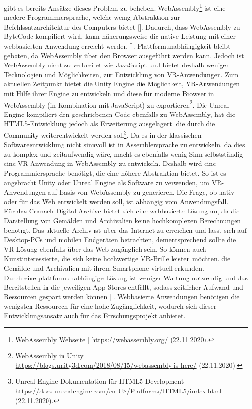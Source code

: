 \documentclass[a4paper,12pt,oneside]{article}
\begin{document}
        gibt es bereits Ansätze dieses Problem zu beheben. WebAssembly\footnote{WebAssembly Webseite | \url{https://webassembly.org/} (22.11.2020).}
        ist eine niedere Programmiersprache, welche wenig Abstraktion zur Befehlssatzarchitektur
        des Computers bietet [\cite[185]{Haas2017Jun}]. Dadurch, dass WebAssembly zu ByteCode
        kompiliert wird, kann näherungsweise die native Leistung mit einer webbasierten Anwendung 
        erreicht werden [\cite[186]{Haas2017Jun}]. 
        Plattformunabhängigkeit bleibt geboten,
        da WebAssembly über den Browser ausgeführt werden kann.
        Jedoch ist WebAssembly nicht
        so verbreitet wie JavaScript und bietet deshalb weniger Technologien und Möglichkeiten,
        zur Entwicklung von VR-Anwendungen. Zum aktuellen Zeitpunkt bietet die Unity Engine
        die Möglichkeit, VR-Anwendungen mit Hilfe ihrer Engine zu entwickeln und
        diese für moderne Browser in WebAssembly (in Kombination mit JavaScript) 
        zu exportieren\footnote{WebAssembly in Unity | \url{https://blogs.unity3d.com/2018/08/15/webassembly-is-here/} (22.11.2020).}.
        Die Unreal Engine kompiliert den geschriebenen Code ebenfalls zu WebAssembly,
        hat die HTML5-Entwicklung jedoch als Erweiterung ausgelagert, die durch
        die Community weiterentwickelt werden soll\footnote{Unreal Engine Dokumentation für HTML5 Development | \url{https://docs.unrealengine.com/en-US/Platforms/HTML5/index.html} (22.11.2020).}.
        Da es in der klassischen Softwareentwicklung nicht sinnvoll ist in Assemblersprache
        zu entwickeln, da dies zu komplex und zeitaufwendig wäre, 
        macht es ebenfalls wenig Sinn selbstständig eine VR-Anwendung in 
        WebAssembly zu entwickeln. Deshalb wird eine Programmiersprache benötigt, die
        eine höhere Abstraktion bietet. So ist es angebracht Unity oder Unreal Engine 
        als Software zu verwenden,
        um VR-Anwendungen auf Basis von WebAssembly zu generieren.
        Die Frage, ob nativ oder für das Web entwickelt werden soll, 
        ist abhängig vom Anwendungsfall. \\
        Für das Cranach Digital Archive bietet sich eine webbasierte Lösung
        an, da die Darstellung von Gemälden und Archivalien keine hochkomplexen Berechnungen
        benötigt. Das aktuelle Archiv ist über das Internet zu erreichen und lässt sich auf
        Desktop-PCs und mobilen Endgeräten betrachten, dementsprechend 
        sollte die VR-Lösung ebenfalls
        über das Web zugänglich sein. So können auch Kunstinteressierte, die sich keine hochwertige
        VR-Brille leisten möchten, die Gemälde und Archivalien mit ihrem Smartphone
        virtuell erkunden. \\
        Durch eine plattformunabhängige Lösung ist weniger Wartung notwendig und das
        Bereitstellen in die jeweiligen App Stores entfällt, sodass zeitlicher Aufwand und
        Ressourcen gespart werden können [\cite[248]{Ater2017}]. Webbasierte Anwendungen 
        benötigen die wenigsten Ressourcen für eine hohe Zugänglichkeit, wodurch sich dieser
        Entwicklungsansatz auch für das Forschungsprojekt anbietet.
\end{document}
